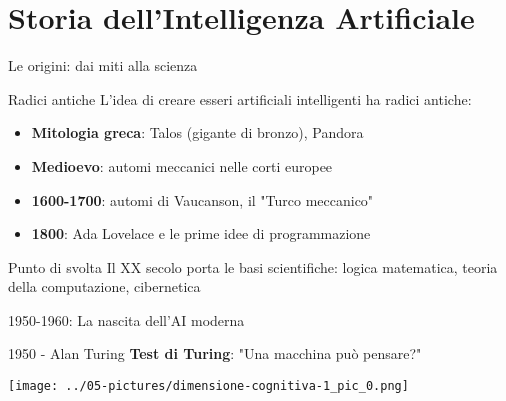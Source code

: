 \documentclass[aspectratio=169,12pt]{beamer}
\begin{document}
\section{Storia dell'Intelligenza Artificiale}
%
%
\begin{frame}{Le origini: dai miti alla scienza}
    \begin{block}{Radici antiche}
        L'idea di creare esseri artificiali intelligenti ha radici antiche:
    \end{block}
    
    \begin{itemize}
        \item \textbf{Mitologia greca}: Talos (gigante di bronzo), Pandora
        \item \textbf{Medioevo}: automi meccanici nelle corti europee
        \item \textbf{1600-1700}: automi di Vaucanson, il "Turco meccanico"
        \item \textbf{1800}: Ada Lovelace e le prime idee di programmazione
    \end{itemize}
    
    \vspace{0.3cm}
    
    \begin{alertblock}{Punto di svolta}
        Il XX secolo porta le basi scientifiche: logica matematica, teoria della computazione, cibernetica
    \end{alertblock}
\end{frame}
%
%
\begin{frame}{1950-1960: La nascita dell'AI moderna}
    \begin{block}{1950 - Alan Turing}
        \textbf{Test di Turing}: "Una macchina può pensare?"
    \end{block}
    
\begin{center}
\texttt{[image: ../05-pictures/dimensione-cognitiva-1\_pic\_0.png]} 
\end{center}

\end{frame}
%
%
\end{document}
